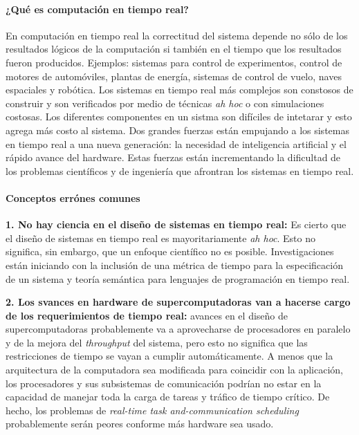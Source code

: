 \paragraph{\textnormal{\textbf{¿Qué es computación en tiempo real?}}} En computación en tiempo real la correctitud del sistema depende no sólo de los resultados lógicos de la computación si también en el tiempo que los resultados fueron producidos. Ejemplos: sistemas para control de experimentos, control de motores de automóviles, plantas de energía, sistemas de control de vuelo, naves espaciales y robótica. Los sistemas en tiempo real más complejos son constosos de construir y son verificados por medio de técnicas \emph{ah hoc} o con simulaciones costosas. Los diferentes componentes en un sistma son difíciles de intetarar y esto agrega más costo al sistema. Dos grandes fuerzas están empujando a los sistemas en tiempo real a una nueva generación: la necesidad de inteligencia artificial y el rápido avance del hardware. Estas fuerzas están incrementando la dificultad de los problemas científicos y de ingeniería que afrontran los sistemas en tiempo real.

\paragraph{\textnormal{\textbf{Conceptos errónes comunes}}} \textbf{1. No hay ciencia en el diseño de sistemas en tiempo real:} Es cierto que el diseño de sistemas en tiempo real es mayoritariamente \emph{ah hoc}. Esto no significa, sin embargo, que un enfoque científico no es posible. Investigaciones están iniciando con la inclusión de una métrica de tiempo para la especificación de un sistema y teoría semántica para lenguajes de programación en tiempo real. 

\textbf{2. Los svances en hardware de supercomputadoras van a hacerse cargo de los requerimientos de tiempo real:} avances en el diseño de supercomputadoras probablemente va a aprovecharse de procesadores en paralelo y de la mejora del \emph{throughput} del sistema, pero esto no significa que las restricciones de tiempo se vayan a cumplir automáticamente. A menos que la arquitectura de la computadora sea modificada para coincidir con la aplicación, los procesadores y sus subsistemas de comunicación podrían no estar en la capacidad de manejar toda la carga de tareas y tráfico de tiempo crítico. De hecho, los problemas de \emph{real-time task and-communication scheduling} probablemente serán peores conforme más hardware sea usado. 

